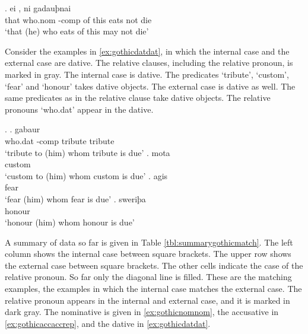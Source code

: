 \exg. ei    , ni gadauþnai\\
 that who.\ac{nom} -\ac{comp} {of this} eats\scsub{[nom]} not die\scsub{[nom]}\\
 `that (he) who eats of this may not die' \label{ex:gothicnomnom}

 Consider the examples in \ref{ex:gothicdatdat}, in which the internal case and the external case are dative.
 The relative clauses, including the relative pronoun, is marked in gray.
 The internal case is dative. The predicates  `tribute',  `custom',  `fear' and  `honour' takes dative objects.
 The external case is dative as well. The same predicates as in the relative clause take dative objects.
 The relative pronouns  `who.\ac{dat}' appear in the dative.

\ex.\label{ex:gothicdatdat}
\ag.    gabaur\\
 who.\ac{dat} -\ac{comp} tribute\scsub{[dat]} tribute\scsub{[dat]}\\
 `tribute to (him) whom tribute is due'
\bg.    mota\\
    custom\scsub{[dat]}\\
 `custom to (him) whom custom is due'
\bg.    agis\\
    fear\scsub{[dat]}\\
 `fear (him) whom fear is due'
\bg.    sweriþa\\
    honour\scsub{[dat]}\\
 `honour (him) whom honour is due' 

A summary of data so far is given in Table \ref{tbl:summarygothicmatch}. The left column shows the internal case between square brackets. The upper row shows the external case between square brackets. The other cells indicate the case of the relative pronoun.
So far only the diagonal line is filled. These are the matching examples, the examples in which the internal case matches the external case. The relative pronoun appears in the internal and external case, and it is marked in dark gray. The nominative is given in \ref{ex:gothicnomnom}, the accusative in \ref{ex:gothicaccaccrep}, and the dative in \ref{ex:gothicdatdat}.





